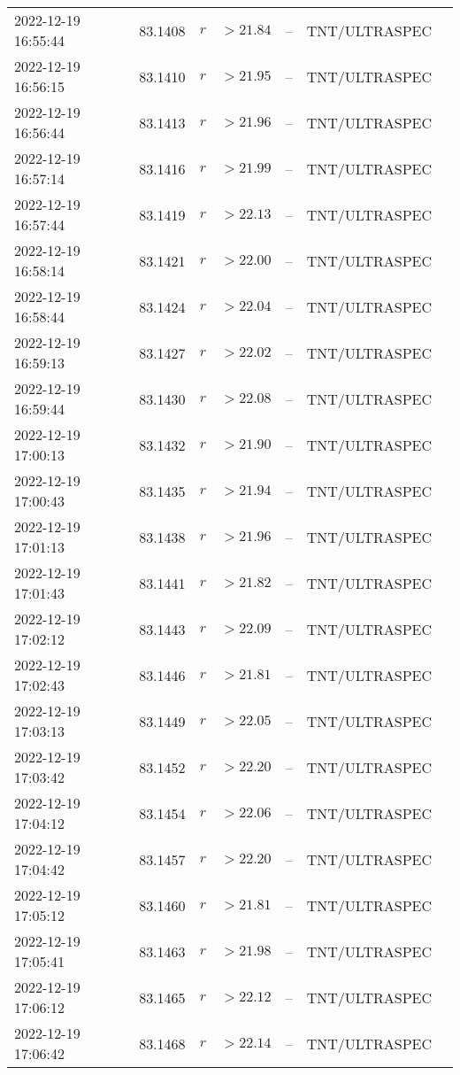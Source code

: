 \documentclass{nature_plusfigure}
\begin{document}
\begin{supplement}
\begin{center}
\begin{longtable}{lllllll}
2022-12-19 16:55:44 & 83.1408 & $r$ & $>21.84$ & -- & TNT/ULTRASPEC &  \\ 
2022-12-19 16:56:15 & 83.1410 & $r$ & $>21.95$ & -- & TNT/ULTRASPEC &  \\ 
2022-12-19 16:56:44 & 83.1413 & $r$ & $>21.96$ & -- & TNT/ULTRASPEC &  \\ 
2022-12-19 16:57:14 & 83.1416 & $r$ & $>21.99$ & -- & TNT/ULTRASPEC &  \\ 
2022-12-19 16:57:44 & 83.1419 & $r$ & $>22.13$ & -- & TNT/ULTRASPEC &  \\ 
2022-12-19 16:58:14 & 83.1421 & $r$ & $>22.00$ & -- & TNT/ULTRASPEC &  \\ 
2022-12-19 16:58:44 & 83.1424 & $r$ & $>22.04$ & -- & TNT/ULTRASPEC &  \\ 
2022-12-19 16:59:13 & 83.1427 & $r$ & $>22.02$ & -- & TNT/ULTRASPEC &  \\ 
2022-12-19 16:59:44 & 83.1430 & $r$ & $>22.08$ & -- & TNT/ULTRASPEC &  \\ 
2022-12-19 17:00:13 & 83.1432 & $r$ & $>21.90$ & -- & TNT/ULTRASPEC &  \\ 
2022-12-19 17:00:43 & 83.1435 & $r$ & $>21.94$ & -- & TNT/ULTRASPEC &  \\ 
2022-12-19 17:01:13 & 83.1438 & $r$ & $>21.96$ & -- & TNT/ULTRASPEC &  \\ 
2022-12-19 17:01:43 & 83.1441 & $r$ & $>21.82$ & -- & TNT/ULTRASPEC &  \\ 
2022-12-19 17:02:12 & 83.1443 & $r$ & $>22.09$ & -- & TNT/ULTRASPEC &  \\ 
2022-12-19 17:02:43 & 83.1446 & $r$ & $>21.81$ & -- & TNT/ULTRASPEC &  \\ 
2022-12-19 17:03:13 & 83.1449 & $r$ & $>22.05$ & -- & TNT/ULTRASPEC &  \\ 
2022-12-19 17:03:42 & 83.1452 & $r$ & $>22.20$ & -- & TNT/ULTRASPEC &  \\ 
2022-12-19 17:04:12 & 83.1454 & $r$ & $>22.06$ & -- & TNT/ULTRASPEC &  \\ 
2022-12-19 17:04:42 & 83.1457 & $r$ & $>22.20$ & -- & TNT/ULTRASPEC &  \\ 
2022-12-19 17:05:12 & 83.1460 & $r$ & $>21.81$ & -- & TNT/ULTRASPEC &  \\ 
2022-12-19 17:05:41 & 83.1463 & $r$ & $>21.98$ & -- & TNT/ULTRASPEC &  \\ 
2022-12-19 17:06:12 & 83.1465 & $r$ & $>22.12$ & -- & TNT/ULTRASPEC &  \\ 
2022-12-19 17:06:42 & 83.1468 & $r$ & $>22.14$ & -- & TNT/ULTRASPEC &  \\ 

\end{longtable}
\end{center}
\end{supplement}
\end{document}
